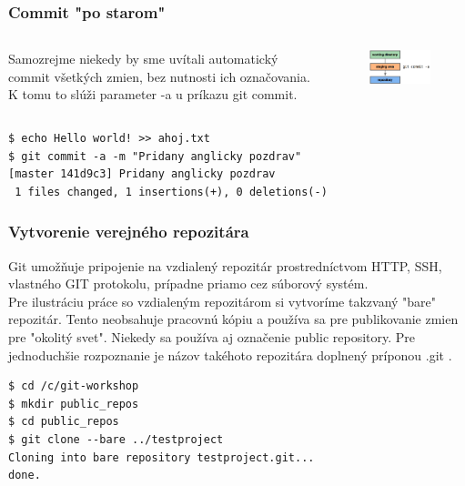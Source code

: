 \documentclass[red]{beamer}
\begin{document}
\begin{frame}[fragile]
\frametitle{Commit "po starom"}   

\begin{columns}
\begin{column}[l]{7cm}
Samozrejme niekedy by sme uvítali automatický commit všetkých zmien, bez nutnosti ich označovania. K tomu to slúži parameter -a u príkazu git commit. 
\end{column}
\begin{column}[r]{5cm}
\begin{figure}
  \centering
  \includegraphics[scale=0.9]{git-pics/staging2.png}
\end{figure}
\end{column}
\end{columns} 
\begin{block}{}
\begin{verbatim}
$ echo Hello world! >> ahoj.txt
$ git commit -a -m "Pridany anglicky pozdrav"
[master 141d9c3] Pridany anglicky pozdrav
 1 files changed, 1 insertions(+), 0 deletions(-)
\end{verbatim}
\end{block}
\end{frame}

\begin{frame}[fragile]
\frametitle{Vytvorenie verejného repozitára}
Git umožňuje pripojenie na vzdialený repozitár prostredníctvom HTTP, SSH, vlastného GIT protokolu, prípadne priamo cez súborový systém. \\
Pre ilustráciu práce so vzdialeným repozitárom si vytvoríme takzvaný "bare" repozitár. Tento neobsahuje pracovnú kópiu a používa sa pre publikovanie zmien pre "okolitý svet". Niekedy sa používa aj označenie public repository. Pre jednoduchšie rozpoznanie je názov takéhoto repozitára doplnený príponou .git .

\begin{block}{}
\begin{verbatim}
$ cd /c/git-workshop
$ mkdir public_repos
$ cd public_repos
$ git clone --bare ../testproject
Cloning into bare repository testproject.git...
done.
\end{verbatim}
\end{block}
\end{frame}
\end{document}
